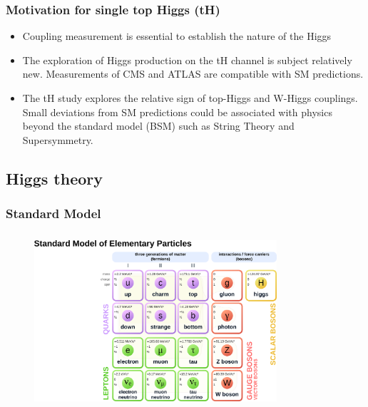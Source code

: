 \documentclass[11pt]{beamer}
\begin{document}
\begin{frame}
\frametitle{Motivation  for single top Higgs (tH)}
\begin{itemize}
\item Coupling measurement is essential to establish the nature of the Higgs
\item The exploration of Higgs production on the tH channel is subject relatively new. Measurements of CMS and ATLAS are compatible with SM predictions.
\item The tH study explores the relative sign of top-Higgs  and W-Higgs couplings.\\ Small deviations from SM predictions could be associated with physics beyond the
standard model (BSM) such as String Theory and  Supersymmetry.
\end{itemize}
\end{frame}

\begin{frame}
\section{Higgs theory}
\frametitle{Standard Model}
\begin{center}
\begin{figure}
	\includegraphics[width=9cm,height=6.5cm]{figures/sm1.png}
\end{figure}
\end{center}
\end{frame}
\end{document}
